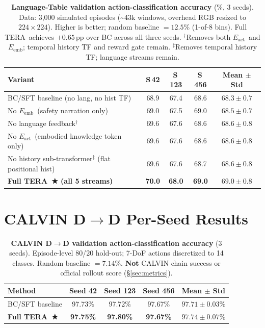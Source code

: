 \documentclass{article}
\newcommand{\modelname}{\textsc{TERA}\xspace}
\newcommand{\Lact}{$E_{\mathrm{act}}$\xspace}
\newcommand{\Lexp}{$E_{\mathrm{emb}}$\xspace}
\begin{document}
\begin{table}[h]
\centering
\caption{
  \textbf{Language-Table validation action-classification accuracy} (\%, 3 seeds).
  Data: 3,000 simulated episodes (\textasciitilde43k windows, overhead RGB resized to
  $224{\times}224$). Higher is better; random baseline $= 12.5\%$ (1-of-8 bins).
  Full \modelname\ achieves $+0.65$\,pp over BC across all three seeds.
  $^\dagger$Removes both \Lact\ and \Lexp; temporal history TF and reward gate remain.
  $^\ddagger$Removes temporal history TF; language streams remain.
}
\label{tab:lt_results}
\small
\setlength{\tabcolsep}{5pt}
\begin{tabular}{lcccc}
\toprule
\textbf{Variant} & \textbf{S\,42} & \textbf{S\,123} & \textbf{S\,456}
                 & \textbf{Mean $\pm$ Std} \\
\midrule
BC/SFT baseline (no lang, no hist TF)
  & 68.9 & 67.4 & 68.6 & $68.3 \pm 0.7$ \\
No \Lexp\ (safety narration only)
  & 69.0 & 67.5 & 69.0 & $68.5 \pm 0.7$ \\
No language feedback$^\dagger$
  & 69.6 & 67.6 & 68.6 & $68.6 \pm 0.8$ \\
No \Lact\ (embodied knowledge token only)
  & 69.6 & 67.6 & 68.6 & $68.6 \pm 0.8$ \\
No history sub-transformer$^\ddagger$ (flat positional hist)
  & 69.6 & 67.6 & 68.7 & $68.6 \pm 0.8$ \\
\midrule
\textbf{Full \modelname\ ★ (all 5 streams)}
  & \textbf{70.0} & \textbf{68.0} & \textbf{69.0} & $\mathbf{69.0 \pm 0.8}$ \\
\bottomrule
\end{tabular}
\end{table}

\section{CALVIN D$\to$D Per-Seed Results}
\label{app:calvin_full}

\begin{table}[h]
\centering
\caption{
  \textbf{CALVIN D$\to$D validation action-classification accuracy} (3 seeds).
  Episode-level 80/20 hold-out; 7-DoF actions discretized to 14 classes.
  Random baseline $= 7.14\%$.
  \textbf{Not} CALVIN chain success or official rollout score (\S\ref{sec:metrics}).
}
\label{tab:calvin_results}
\small
\setlength{\tabcolsep}{5pt}
\begin{tabular}{lcccc}
\toprule
\textbf{Method} & \textbf{Seed 42} & \textbf{Seed 123} & \textbf{Seed 456}
                & \textbf{Mean $\pm$ Std} \\
\midrule
BC/SFT baseline
  & 97.73\% & 97.72\% & 97.67\% & $97.71 \pm 0.03\%$ \\
\textbf{Full \modelname\ ★}
  & \textbf{97.75\%} & \textbf{97.80\%} & \textbf{97.67\%}
  & $\mathbf{97.74 \pm 0.07\%}$ \\
\bottomrule
\end{tabular}
\end{table}
\end{document}
